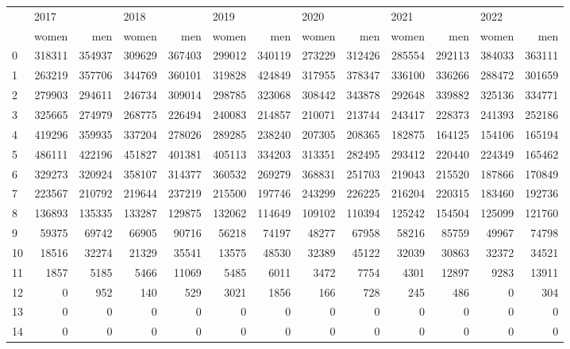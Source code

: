 \begin{tabular}{lrrrrrrrrrrrr}
\toprule
{} & \multicolumn{2}{l}{2017} & \multicolumn{2}{l}{2018} & \multicolumn{2}{l}{2019} & \multicolumn{2}{l}{2020} & \multicolumn{2}{l}{2021} & \multicolumn{2}{l}{2022} \\
{} &   women &     men &   women &     men &   women &     men &   women &     men &   women &     men &   women &     men \\
\midrule
0  &  318311 &  354937 &  309629 &  367403 &  299012 &  340119 &  273229 &  312426 &  285554 &  292113 &  384033 &  363111 \\
1  &  263219 &  357706 &  344769 &  360101 &  319828 &  424849 &  317955 &  378347 &  336100 &  336266 &  288472 &  301659 \\
2  &  279903 &  294611 &  246734 &  309014 &  298785 &  323068 &  308442 &  343878 &  292648 &  339882 &  325136 &  334771 \\
3  &  325665 &  274979 &  268775 &  226494 &  240083 &  214857 &  210071 &  213744 &  243417 &  228373 &  241393 &  252186 \\
4  &  419296 &  359935 &  337204 &  278026 &  289285 &  238240 &  207305 &  208365 &  182875 &  164125 &  154106 &  165194 \\
5  &  486111 &  422196 &  451827 &  401381 &  405113 &  334203 &  313351 &  282495 &  293412 &  220440 &  224349 &  165462 \\
6  &  329273 &  320924 &  358107 &  314377 &  360532 &  269279 &  368831 &  251703 &  219043 &  215520 &  187866 &  170849 \\
7  &  223567 &  210792 &  219644 &  237219 &  215500 &  197746 &  243299 &  226225 &  216204 &  220315 &  183460 &  192736 \\
8  &  136893 &  135335 &  133287 &  129875 &  132062 &  114649 &  109102 &  110394 &  125242 &  154504 &  125099 &  121760 \\
9  &   59375 &   69742 &   66905 &   90716 &   56218 &   74197 &   48277 &   67958 &   58216 &   85759 &   49967 &   74798 \\
10 &   18516 &   32274 &   21329 &   35541 &   13575 &   48530 &   32389 &   45122 &   32039 &   30863 &   32372 &   34521 \\
11 &    1857 &    5185 &    5466 &   11069 &    5485 &    6011 &    3472 &    7754 &    4301 &   12897 &    9283 &   13911 \\
12 &       0 &     952 &     140 &     529 &    3021 &    1856 &     166 &     728 &     245 &     486 &       0 &     304 \\
13 &       0 &       0 &       0 &       0 &       0 &       0 &       0 &       0 &       0 &       0 &       0 &       0 \\
14 &       0 &       0 &       0 &       0 &       0 &       0 &       0 &       0 &       0 &       0 &       0 &       0 \\
\bottomrule
\end{tabular}
